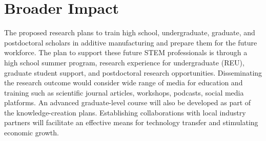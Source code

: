 \documentclass[12pt]{article}
\begin{document}
\section*{Broader Impact}
The proposed research plans to train high school, undergraduate, graduate, and postdoctoral scholars in additive manufacturing and prepare them for the future workforce. The plan to support these future STEM professionals is through a high school summer program, research experience for undergraduate (REU), graduate student support, and postdoctoral research opportunities. Disseminating the research outcome would consider wide range of media for education and training such as scientific journal articles, workshops, podcasts, social media platforms. An advanced graduate-level course will also be developed as part of the knowledge-creation plans. Establishing collaborations with local industry partners will facilitate an effective means for technology transfer and stimulating economic growth.
\end{document}
